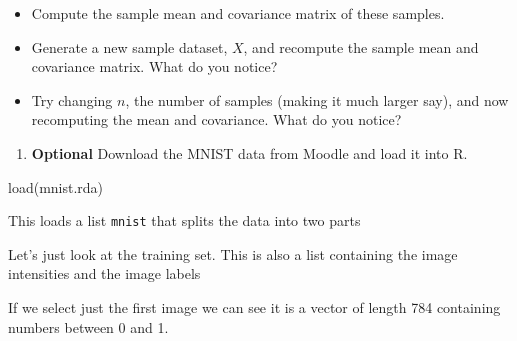 \documentclass[
]{book}
\newenvironment{Shaded}{\begin{snugshade}}{\end{snugshade}}
\newcommand{\CommentTok}[1]{\textcolor[rgb]{0.56,0.35,0.01}{\textit{#1}}}
\newcommand{\DocumentationTok}[1]{\textcolor[rgb]{0.56,0.35,0.01}{\textbf{\textit{#1}}}}
\newcommand{\FunctionTok}[1]{\textcolor[rgb]{0.00,0.00,0.00}{#1}}
\newcommand{\NormalTok}[1]{#1}
\newcommand{\SpecialCharTok}[1]{\textcolor[rgb]{0.00,0.00,0.00}{#1}}
\newcommand{\StringTok}[1]{\textcolor[rgb]{0.31,0.60,0.02}{#1}}
\providecommand{\tightlist}{%
  \setlength{\itemsep}{0pt}\setlength{\parskip}{0pt}}
\theoremstyle{definition}
\theoremstyle{definition}
\theoremstyle{definition}
\theoremstyle{definition}
\theoremstyle{remark}
\begin{document}
\begin{itemize}
\tightlist
\item
  Compute the sample mean and covariance matrix of these samples.
\item
  Generate a new sample dataset, \(X\), and recompute the sample mean and covariance matrix. What do you notice?
\item
  Try changing \(n\), the number of samples (making it much larger say), and now recomputing the mean and covariance. What do you notice?
\end{itemize}

\begin{enumerate}
\def\labelenumi{\arabic{enumi}.}
\setcounter{enumi}{4}
\tightlist
\item
  \textbf{Optional} Download the MNIST data from Moodle and load it into R.
\end{enumerate}

\begin{Shaded}
\begin{Highlighting}[]
\FunctionTok{load}\NormalTok{(}\StringTok{\textquotesingle{}mnist.rda\textquotesingle{}}\NormalTok{)}
\end{Highlighting}
\end{Shaded}

This loads a list \texttt{mnist} that splits the data into two parts

\begin{Shaded}
\end{Shaded}

Let's just look at the training set. This is also a list containing the image intensities and the image labels

\begin{Shaded}
\end{Shaded}

If we select just the first image we can see it is a vector of length 784 containing numbers between 0 and 1.
\end{document}
